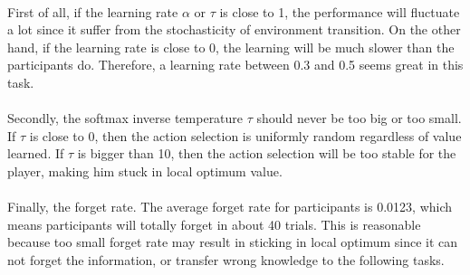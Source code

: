 \paragraph{}
First of all, if the learning rate $\alpha$ or $\tau$ is close to 1, the performance will fluctuate a lot since it suffer from the stochasticity of environment transition. On the other hand, if the learning rate is close to 0, the learning will be much slower than the participants do. Therefore, a learning rate between 0.3 and 0.5 seems great in this task. 

\paragraph{}
Secondly, the softmax inverse temperature $\tau$ should never be too big or too small. If $\tau$ is close to 0, then the action selection is uniformly random regardless of value learned. If $\tau$ is bigger than 10, then the action selection will be too stable for the player, making him stuck in local optimum value. 

\paragraph{}
Finally, the forget rate. The average forget rate for participants is 0.0123, which means participants will totally forget in about 40 trials. This is reasonable because too small forget rate may result in sticking in local optimum since it can not forget the information, or transfer wrong knowledge to the following tasks. 








